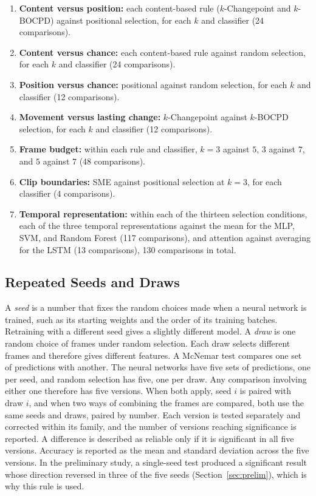 \begin{enumerate}
   \item \textbf{Content versus position:} each content-based rule ($k$-Changepoint and $k$-BOCPD) against positional selection, for each $k$ and classifier (24 comparisons).
   \item \textbf{Content versus chance:} each content-based rule against random selection, for each $k$ and classifier (24 comparisons).
   \item \textbf{Position versus chance:} positional against random selection, for each $k$ and classifier (12 comparisons).
   \item \textbf{Movement versus lasting change:} $k$-Changepoint against $k$-BOCPD selection, for each $k$ and classifier (12 comparisons).
   \item \textbf{Frame budget:} within each rule and classifier, $k = 3$ against $5$, $3$ against $7$, and $5$ against $7$ (48 comparisons).
   \item \textbf{Clip boundaries:} SME against positional selection at $k = 3$, for each classifier (4 comparisons).
   \item \textbf{Temporal representation:} within each of the thirteen selection conditions, each of the three temporal representations against the mean for the MLP, SVM, and Random Forest (117 comparisons), and attention against averaging for the LSTM (13 comparisons), 130 comparisons in total.
\end{enumerate}

\subsection{Repeated Seeds and Draws}
\label{sec:seeds}

A \emph{seed} is a number that fixes the random choices made when a neural network is trained, such as its starting weights and the order of its training batches. Retraining with a different seed gives a slightly different model. A \emph{draw} is one random choice of frames under random selection. Each draw selects different frames and therefore gives different features. A McNemar test compares one set of predictions with another. The neural networks have five sets of predictions, one per seed, and random selection has five, one per draw. Any comparison involving either one therefore has five versions. When both apply, seed $i$ is paired with draw $i$, and when two ways of combining the frames are compared, both use the same seeds and draws, paired by number. Each version is tested separately and corrected within its family, and the number of versions reaching significance is reported. A difference is described as reliable only if it is significant in all five versions. Accuracy is reported as the mean and standard deviation across the five versions. In the preliminary study, a single-seed test produced a significant result whose direction reversed in three of the five seeds (Section~\ref{sec:prelim}), which is why this rule is used.

